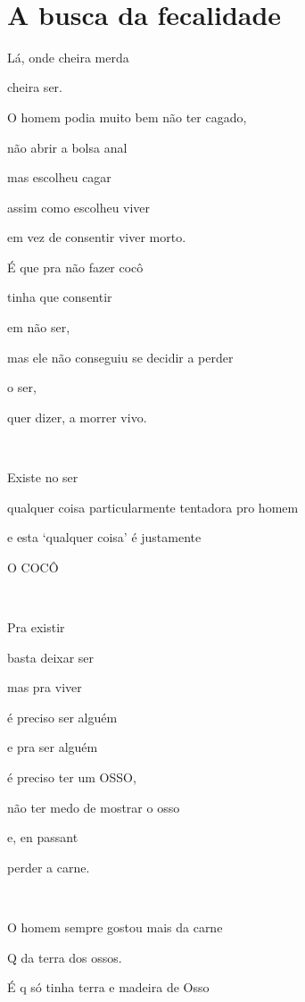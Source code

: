 ~

\chapter{A busca da fecalidade}



Lá, onde cheira merda

cheira ser.

O homem podia muito bem não ter cagado,

não abrir a bolsa anal

mas escolheu cagar

assim como escolheu viver

em vez de consentir viver morto.

É que pra não fazer cocô

tinha que consentir

em não ser, 

mas ele não conseguiu se decidir a perder

o ser,

quer dizer, a morrer vivo.

~

Existe no ser

qualquer coisa particularmente tentadora pro homem

e esta `qualquer coisa' é justamente

O COCÔ

~


Pra existir

basta deixar ser

mas pra viver

é preciso ser alguém

e pra ser alguém

é preciso ter um OSSO,

não ter medo de mostrar o osso

e, en passant

perder a carne.


~

O homem sempre gostou mais da carne

Q da terra dos ossos. 

É q só tinha terra e madeira de Osso

